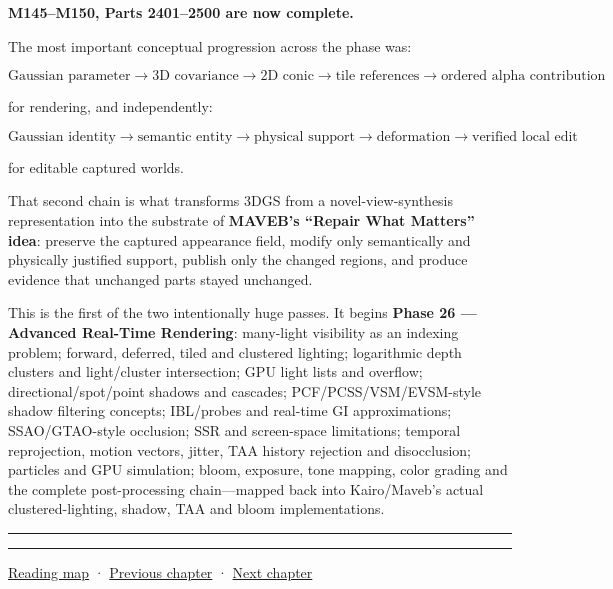 \textbf{M145--M150, Parts 2401--2500 are now complete.}

The most important conceptual progression across the phase was:

\[
\boxed{
\text{Gaussian parameter}
\rightarrow
\text{3D covariance}
\rightarrow
\text{2D conic}
\rightarrow
\text{tile references}
\rightarrow
\text{ordered alpha contribution}
}
\]

for rendering, and independently:

\[
\boxed{
\text{Gaussian identity}
\rightarrow
\text{semantic entity}
\rightarrow
\text{physical support}
\rightarrow
\text{deformation}
\rightarrow
\text{verified local edit}
}
\]

for editable captured worlds.

That second chain is what transforms 3DGS from a novel-view-synthesis representation into the substrate of \textbf{MAVEB's ``Repair What Matters'' idea}: preserve the captured appearance field, modify only semantically and physically justified support, publish only the changed regions, and produce evidence that unchanged parts stayed unchanged.

This is the first of the two intentionally huge passes. It begins \textbf{Phase 26 --- Advanced Real-Time Rendering}: many-light visibility as an indexing problem; forward, deferred, tiled and clustered lighting; logarithmic depth clusters and light/cluster intersection; GPU light lists and overflow; directional/spot/point shadows and cascades; PCF/PCSS/VSM/EVSM-style shadow filtering concepts; IBL/probes and real-time GI approximations; SSAO/GTAO-style occlusion; SSR and screen-space limitations; temporal reprojection, motion vectors, jitter, TAA history rejection and disocclusion; particles and GPU simulation; bloom, exposure, tone mapping, color grading and the complete post-processing chain---mapped back into Kairo/Maveb's actual clustered-lighting, shadow, TAA and bloom implementations.

\begin{center}\rule{0.5\linewidth}{0.5pt}\end{center}

\begin{center}\rule{0.5\linewidth}{0.5pt}\end{center}

\href{Chapter\%20Edition/03\%20-\%20Game\%20Engine/00\%20-\%20Reading\%20Map}{Reading map} · \hyperref[06-engine-ii-ch044]{Previous chapter} · \hyperref[06-engine-ii-ch046]{Next chapter}
